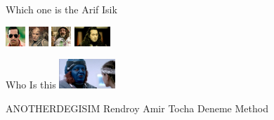 \documentclass{exam}
\begin{document}
\begin{questions}
\question Which one is the Arif Isik\newline
\begin{oneparchoices}
\choice \includegraphics[height=2em]{arifisik.jpg}
\choice \includegraphics[height=2em]{216.jpg}
\choice \includegraphics[height=2em]{faruk.jpg}
\choice \includegraphics[height=2em]{komutanlogar.jpeg}
\end{oneparchoices}
\question Who Is this\newline
\includegraphics[height=3em]{rendroy2.jpg} \newline
\begin{oneparchoices}
\choice ANOTHERDEGISIM
\choice Rendroy
\choice Amir Tocha
\choice Deneme Method
\end{oneparchoices}
\end{questions}
\end{document}
